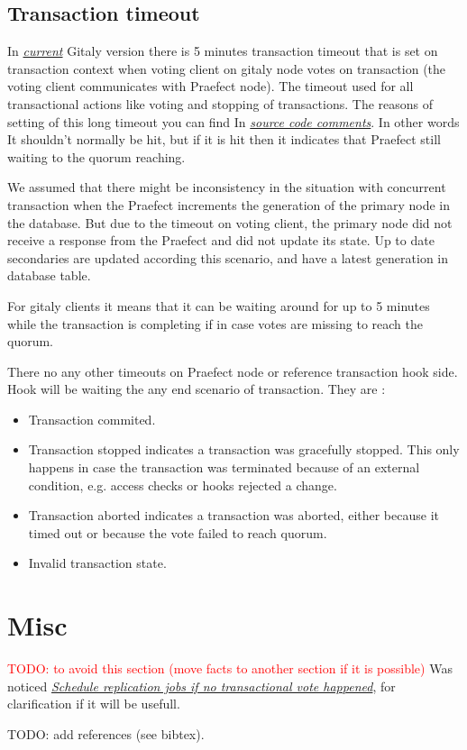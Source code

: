 \documentclass[acmlarge, screen, nonacm]{acmart}
\newcommand{\todo}[1]{\textcolor{red}{TODO: #1}}
\begin{document}
\subsection{Transaction timeout}
In \emph{\href{https://gitlab.com/gitlab-org/gitaly/-/tags/v14.0.0-rc1}{ current}} 
Gitaly version there is 5 minutes transaction timeout that is set on transaction 
context when voting client on gitaly node votes on transaction (the voting client 
communicates with Praefect node).
The timeout used for all transactional actions like voting and stopping of transactions.
 The reasons of setting of this long timeout you can find 
In \emph{\href{https://gitlab.com/gitlab-org/gitaly/-/blob/master/internal/gitaly/transaction/manager.go\#L21}{ source code comments}}. 
In other words It shouldn't normally be hit, but if it is hit then it indicates that Praefect still waiting to the quorum reaching. 

We assumed that there might be inconsistency in the situation with concurrent transaction when the Praefect 
increments the generation of the primary node in the database. But due to the timeout on voting client, 
the primary node did not receive a response from the Praefect and did not update its state. 
Up to date secondaries are updated according this scenario, and have a latest generation in database table. 

For gitaly clients it means that it can be waiting around for up to 5 minutes while the transaction 
is completing if in case votes are missing to reach the quorum.

There no any other timeouts on Praefect node or reference transaction hook side. 
Hook will be waiting the any end scenario of transaction. They are :

\begin{itemize}
\item Transaction commited.
\item Transaction stopped indicates a transaction was gracefully stopped. 
This only happens in case the transaction was terminated because of an external condition, e.g. access checks or hooks rejected a change.
\item Transaction aborted indicates a transaction was aborted, either because it timed out or because the vote failed to reach quorum.
\item Invalid transaction state.
\end{itemize}


\section{Misc}
\todo{to avoid this section (move facts to another section if it is possible)}
  Was noticed
  \emph{\href{https://gitlab.com/gitlab-org/gitaly/-/issues/2466}{Schedule replication jobs if no transactional vote happened}},
  for clarification if it will be usefull.

TODO: add references (see bibtex).
\end{document}
